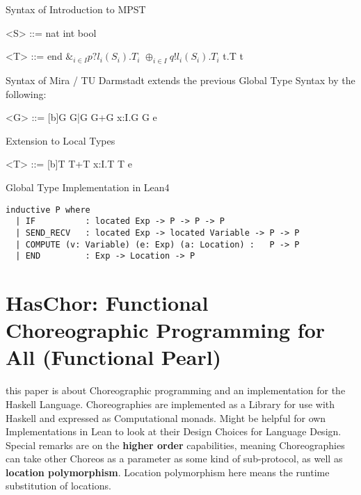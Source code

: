\documentclass[
	ngerman,
	ruledheaders=section,%
	class=report,%
	thesis={type=master},%
	accentcolor=9c,%
	custommargins=true,%
	marginpar=false,%
	parskip=half-,%
	fontsize=11pt,%
]{tudapub}
\begin{document}
Syntax of Introduction to MPST

\begin{grammar}

<S> ::= nat
	\alt int
	\alt bool

\end{grammar}

\begin{grammar}

<T> ::= end
	\alt $ \&_{i \in I} p?l_i(S_i).T_i$
	\alt $\oplus _{i \in I} q!l_i(S_i).T_i$
	\alt \mu t.T
	\alt t

\end{grammar}

Syntax of Mira / TU Darmstadt
extends the previous Global Type Syntax by the following:
\begin{grammar}

<G> ::= [b]G
	\alt G|G
	\alt G+G
	\alt \prod x:I.G
	\alt G e

\end{grammar}

Extension to Local Types
\begin{grammar}

<T> ::= [b]T
	\alt T+T
	\alt \prod x:I.T
	\alt T e

\end{grammar}

Global Type Implementation in Lean4

\begin{lstlisting}[language=lean]
inductive P where
  | IF 			: located Exp -> P -> P -> P
  | SEND_RECV   : located Exp -> located Variable -> P -> P
  | COMPUTE (v: Variable) (e: Exp) (a: Location) :   P -> P
  | END     	: Exp -> Location -> P
\end{lstlisting}

\section{HasChor: Functional Choreographic Programming for All
(Functional Pearl)}
this paper is about Choreographic programming and an implementation for the Haskell Language. Choreographies are implemented as a Library for use with Haskell and expressed as Computational monads. Might be helpful for own Implementations in Lean to look at their Design Choices for Language Design. Special remarks are on the \textbf{higher order} capabilities, meaning Choreographies can take other Choreos as a parameter as some kind of sub-protocol, as well as \textbf{location polymorphism}. Location polymorphism here means the runtime substitution of locations.
\end{document}
